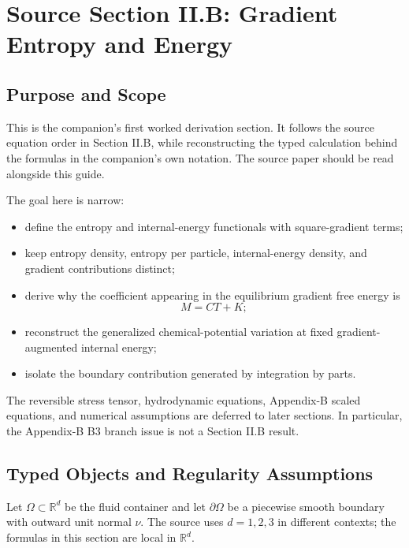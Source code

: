 \section{Source Section II.B: Gradient Entropy and Energy}
\label{sec:gradient-entropy-energy}


\subsection{Purpose and Scope}

This is the companion's first worked derivation section.  It follows the
source equation order in Section II.B, while reconstructing the typed calculation
behind the formulas in the companion's own notation.  The source paper should be
read alongside this guide.

The goal here is narrow:

\begin{itemize}
\item define the entropy and internal-energy functionals with square-gradient
  terms;
\item keep entropy density, entropy per particle, internal-energy density, and
  gradient contributions distinct;
\item derive why the coefficient appearing in the equilibrium gradient free
  energy is
  \[
    M=CT+K;
  \]
\item reconstruct the generalized chemical-potential variation at fixed
  gradient-augmented internal energy;
\item isolate the boundary contribution generated by integration by parts.
\end{itemize}

The reversible stress tensor, hydrodynamic equations, Appendix-B scaled
equations, and numerical assumptions are deferred to later sections.  In
particular, the Appendix-B B3 branch issue is not a Section II.B result.

\subsection{Typed Objects and Regularity Assumptions}

Let \(\Omega\subset\mathbb{R}^d\) be the fluid container and let
\(\partial\Omega\) be a piecewise smooth boundary with outward unit normal
\(\nu\).  The source uses \(d=1,2,3\) in different contexts; the formulas in
this section are local in \(\mathbb{R}^d\).

